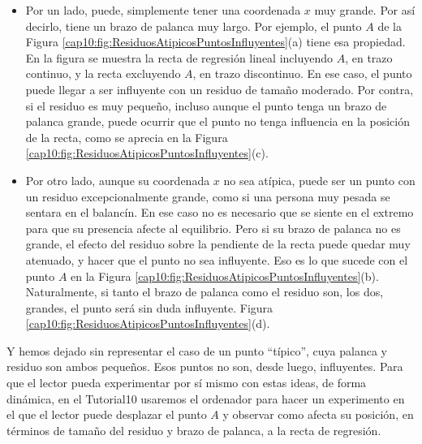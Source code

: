 \begin{itemize}
  \item Por un lado, puede, simplemente tener una coordenada $x$ muy grande. Por así decirlo, tiene un brazo de {\sf palanca} muy largo. Por ejemplo, el punto $A$ de la Figura \ref{cap10:fig:ResiduosAtipicosPuntosInfluyentes}(a) tiene esa propiedad. En la figura se muestra la recta de regresión lineal incluyendo $A$, en trazo continuo, y la recta excluyendo $A$, en trazo discontinuo. En ese caso, el punto puede llegar a ser influyente con  un residuo de tamaño moderado. Por contra, si el residuo es muy pequeño, incluso aunque el punto tenga un brazo de palanca grande, puede ocurrir que el punto no tenga influencia en la posición de la recta, como se aprecia en la Figura \ref{cap10:fig:ResiduosAtipicosPuntosInfluyentes}(c).
  \item  Por otro lado, aunque su coordenada $x$ no sea atípica, puede ser un punto con un residuo excepcionalmente grande,  como si una persona muy pesada se sentara en el balancín. En ese caso no es necesario que se siente en el extremo para que su presencia afecte al equilibrio. Pero si su brazo de palanca no es grande, el efecto del residuo sobre la pendiente de la recta puede quedar muy atenuado, y hacer que el punto no sea influyente. Eso es lo que sucede con el punto $A$ en la Figura \ref{cap10:fig:ResiduosAtipicosPuntosInfluyentes}(b). Naturalmente, si tanto el brazo de palanca como el residuo son, los dos, grandes, el punto será sin duda influyente.  Figura \ref{cap10:fig:ResiduosAtipicosPuntosInfluyentes}(d).
\end{itemize}
Y hemos dejado sin representar el caso de un punto ``típico'', cuya palanca y residuo son ambos pequeños. Esos puntos no son, desde luego, influyentes.  Para que el lector pueda experimentar por sí mismo con estas ideas, de forma dinámica, en el Tutorial10 usaremos el ordenador para hacer un experimento en el que
el lector puede desplazar el punto $A$ y observar como afecta su posición, en términos de tamaño del residuo y brazo de palanca, a la recta de regresión.

